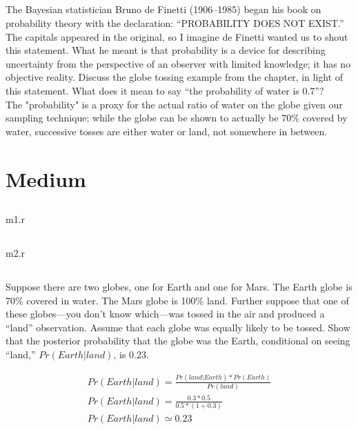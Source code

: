 \documentclass{article}
\begin{document}
\subsection{}
The Bayesian statistician Bruno de Finetti (1906–1985) began his book on probability theory
with the declaration: “PROBABILITY DOES NOT EXIST.” The capitals appeared in the original, so
I imagine de Finetti wanted us to shout this statement. What he meant is that probability is a device
for describing uncertainty from the perspective of an observer with limited knowledge; it has no
objective reality. Discuss the globe tossing example from the chapter, in light of this statement. What
does it mean to say “the probability of water is 0.7”? \\

The "probability" is a proxy for the actual ratio of water on the globe given our sampling technique;
while the globe can be shown to actually be 70\% covered by water, successive tosses are either water
or land, not somewhere in between.

\pagebreak
\section{Medium}

\subsection{}
m1.r

\subsection{}
m2.r

\subsection{}
Suppose there are two globes, one for Earth and one for Mars.
The Earth globe is 70\% covered in water.  The Mars globe is 100\% land.
Further suppose that one of these globes—you don’t know which—was tossed
in the air and produced a “land” observation.
Assume that each globe was equally likely to be tossed.
Show that the posterior probability that the globe was the Earth,
conditional on seeing “land,” $Pr(Earth|land)$, is 0.23.

\begin{gather}
  Pr(Earth|land) = \frac{Pr(land|Earth) * Pr(Earth)}{Pr(land)} \\
  Pr(Earth|land) = \frac{0.3 * 0.5}{0.5 * (1 + 0.3)} \\
  Pr(Earth|land) \simeq 0.23
\end{gather}
\end{document}
